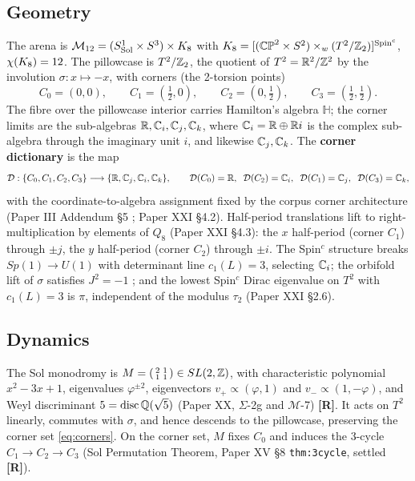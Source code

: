\documentclass[11pt,a4paper]{article}
\theoremstyle{plain}
\theoremstyle{definition}
\theoremstyle{remark}
\newcommand{\HH}{\mathbb{H}}
\newcommand{\rtag}[1]{\textnormal{\textbf{[#1]}}}
\DeclareMathOperator{\disc}{disc}
\begin{document}
\subsection{Geometry}\label{sec:geometry}

The arena is $\mathcal{M}_{12} = (S^1_{\mathrm{Sol}} \times S^3) \times K_8$ with $K_8 = [(\mathbb{CP}^2 \times S^2) \times_w (T^2/\mathbb{Z}_2)]^{\mathrm{Spin}^c}$, $\chi(K_8) = 12$. The pillowcase is $T^2/\mathbb{Z}_2$, the quotient of $T^2 = \mathbb{R}^2/\mathbb{Z}^2$ by the involution $\sigma : x \mapsto -x$, with corners (the 2-torsion points)
\begin{equation}\label{eq:corners}
C_0 = (0,0), \qquad C_1 = (\tfrac12, 0), \qquad C_2 = (0, \tfrac12), \qquad C_3 = (\tfrac12, \tfrac12).
\end{equation}
The fibre over the pillowcase interior carries Hamilton's algebra $\HH$; the corner limits are the sub-algebras $\mathbb{R}, \mathbb{C}_i, \mathbb{C}_j, \mathbb{C}_k$, where $\mathbb{C}_i = \mathbb{R} \oplus \mathbb{R} i$ is the complex sub-algebra through the imaginary unit $i$, and likewise $\mathbb{C}_j, \mathbb{C}_k$. The \textbf{corner dictionary} is the map
\begin{equation}\label{eq:dictionary}
\mathcal{D} : \{C_0, C_1, C_2, C_3\} \longrightarrow \{\mathbb{R}, \mathbb{C}_j, \mathbb{C}_i, \mathbb{C}_k\}, \qquad
\mathcal{D}(C_0) = \mathbb{R}, \;\; \mathcal{D}(C_2) = \mathbb{C}_i, \;\; \mathcal{D}(C_1) = \mathbb{C}_j, \;\; \mathcal{D}(C_3) = \mathbb{C}_k,
\end{equation}
with the coordinate-to-algebra assignment fixed by the corpus corner architecture (Paper III Addendum \S5 \cite{PaperIIIAdd}; Paper XXI \S4.2). Half-period translations lift to right-multiplication by elements of $Q_8$ (Paper XXI \S4.3): the $x$ half-period (corner $C_1$) through $\pm j$, the $y$ half-period (corner $C_2$) through $\pm i$. The Spin$^c$ structure breaks $Sp(1) \to U(1)$ with determinant line $c_1(L) = 3$, selecting $\mathbb{C}_i$; the orbifold lift of $\sigma$ satisfies $J^2 = -1$ \cite{SpincBridge}; and the lowest Spin$^c$ Dirac eigenvalue on $T^2$ with $c_1(L) = 3$ is $\pi$, independent of the modulus $\tau_2$ (Paper XXI \S2.6).

\subsection{Dynamics}\label{sec:dynamics}

The Sol monodromy is $M = \left(\begin{smallmatrix}2&1\\1&1\end{smallmatrix}\right) \in SL(2,\mathbb{Z})$, with characteristic polynomial $x^2 - 3x + 1$, eigenvalues $\varphi^{\pm2}$, eigenvectors $v_+ \propto (\varphi, 1)$ and $v_- \propto (1, -\varphi)$, and Weyl discriminant $5 = \disc\Q(\sqrt5)$ (Paper XX, $\Sigma$-2g and $\mathcal{M}$-7) \rtag{R}. It acts on $T^2$ linearly, commutes with $\sigma$, and hence descends to the pillowcase, preserving the corner set \eqref{eq:corners}. On the corner set, $M$ fixes $C_0$ and induces the 3-cycle $C_1 \to C_2 \to C_3$ (Sol Permutation Theorem, Paper XV \S8 \texttt{thm:3cycle}, settled \rtag{R}).
\end{document}
